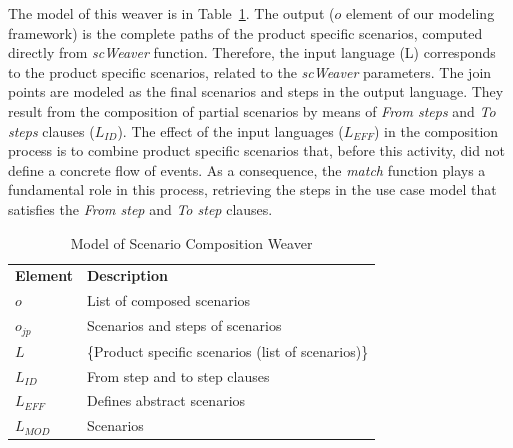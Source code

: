 \documentclass[11pt]{report}
\begin{document}
The model of this weaver is in Table~\ref{tab:sc-weaver}. The output ($o$ element of our modeling framework) is the complete paths of the product specific scenarios, computed directly from \emph{scWeaver} function. Therefore, the input language (L) corresponds to the product specific scenarios, related to the \emph{scWeaver} 
 parameters. 
The join points are modeled as the final scenarios and steps in the output language. They result from the composition of partial scenarios by means of 
\emph{From steps} and \emph{To steps} clauses ($L_{ID}$).  
The effect of the input languages ($L_{EFF}$) in the composition process is to combine 
product specific scenarios that, before this activity, did not define a concrete flow of events. As a consequence, the \emph{match} function 
plays a fundamental role in this process, retrieving the steps in the use case model that satisfies the \emph{From step} and \emph{To step} clauses.  

\begin{table}[hbt]
\begin{center}
 \caption{Model of Scenario Composition Weaver}
\label{tab:sc-weaver}
\begin{tabular}{p{0.4in}p{2.6in}}
   \hline\noalign{\smallskip}
  {\bf Element} & {\bf Description} \\
   \noalign{\smallskip}
   \hline
   \noalign{\smallskip}
   $o$               & List of composed scenarios  \\ 
   $o_{jp}$        & Scenarios and steps of scenarios \\ 
   $L$               & \{Product specific scenarios (list of scenarios)\} \\ 
   $L_{ID}$       & From step and to step clauses \\ 
   $L_{EFF}$    & Defines abstract scenarios  \\ 
   $L_{MOD}$  &  Scenarios \\  
  \hline
  \end{tabular}
\end{center}
\end{table}

%
\end{document}
